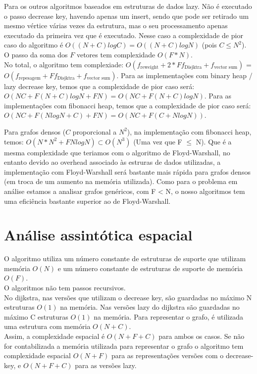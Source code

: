 \documentclass{scrartcl}
\begin{document}
Para os outros algoritmos baseados em estruturas de dados lazy. Não é executado o passo decrease key, havendo apenas um insert, sendo que pode ser retirado um mesmo vértice várias vezes da estrutura, mas o seu processamento apenas executado da primeira vez que é executado. Nesse caso a complexidade de pior caso do algoritmo é $O((N+C)logC) = O((N+C)logN)$ (pois $C \leq N^2$). \\

O passo da soma dos $F$ vetores tem complexidade $O(F*N)$.\\

No total, o algoritmo tem complexiade: $O(f_{\text{reweight}} +  2*Ff_{\text{Disjktra}} + f_{\text{vector sum}})$ = $O(f_{\text{repesagem}} +  Ff_{\text{Disjktra}} + f_{\text{vector sum}})$.
Para as implementações com binary heap / lazy decrease key, temos que a complexidade de pior caso será:
$O(NC +  F(N+C)logN + FN) = O(NC +  F(N+C)logN)$.
Para as implementações com fibonacci heap, temos que a complexidade de pior caso será:
$O(NC +  F(NlogN+C) + FN) = O(NC + F(C + NlogN))$.

Para grafos densos ($C$ proporcional a $N^2$), na implementação com fibonacci heap, temos: $O(N*N^2 + FNlogN) \subset O(N^3)$ (Uma vez que F $\leq$ N). Que é a mesma complexidade que teriamos com o algoritmo de Floyd-Warshall, no entanto devido ao overhead associado às estruras de dados utilizadas, a implementação com Floyd-Warshall será bastante mais rápida para grafos densos (em troca de um aumento na memória utilizada). Como para o problema em análise estamos a analisar grafos genéricos, com F < N, o nosso algoritmos tem uma eficiência bastante superior ao de Floyd-Warshall.

\section*{Análise assintótica espacial}
O algoritmo utiliza um número constante de estruturas de suporte que utilizam memória $O(N)$ e um número constante de estruturas de suporte de memória $O(F)$. \\
O algoritmos não tem passos recursivos. \\
No dijkstra, nas versões que utilizam o decrease key, são guardadas no máximo N estruturas $O(1)$ na memória. Nas versões lazy do dijkstra são guardadas no máximo C estruturas $O(1)$ na memória.
Para representar o grafo, é utilizada uma estrutura com memória $O(N+C)$. \\
Assim, a complexidade espacial é $O(N+F+C)$ para ambos os casos.
Se não for contabilizada a memória utilizada para representar o grafo o algoritmo tem complexidade espacial $O(N+F)$ para as representações versões com o decrease-key, e $O(N+F+C)$ para as versões lazy. \\
\end{document}
